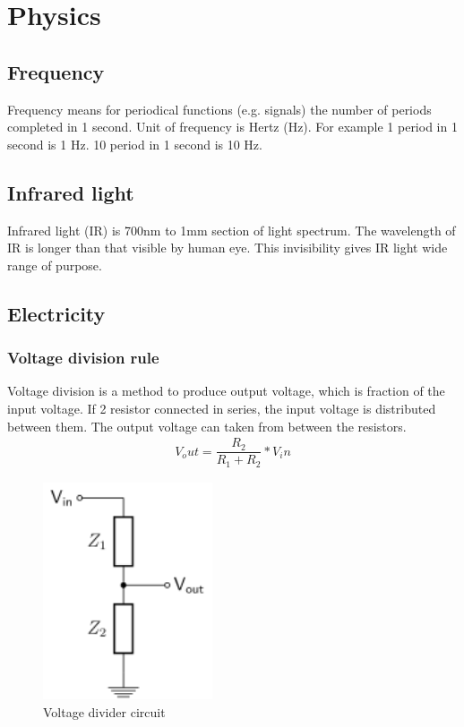 \documentclass[11pt,a4paper,oneside,article]{memoir}
\begin{document}
\chapter{Physics}\label{appx:first}
\section{Frequency}
Frequency means for periodical functions (e.g. signals) the number of periods completed in 1 second. Unit of frequency is Hertz (Hz). For example 1 period in 1 second is 1 Hz. 10 period in 1 second is 10 Hz.

\section{Infrared light}
Infrared light (IR) is 700nm to 1mm section of light spectrum. The wavelength of IR is longer than that visible by human eye. This invisibility gives IR light wide range of purpose.

\section{Electricity}
\subsection{Voltage division rule}
Voltage division is a method to produce output voltage, which is fraction of the input voltage. If 2 resistor connected in series, the input voltage is distributed between them. The output voltage can taken from between the resistors.
\begin{align}
V_out = \dfrac{R_2}{R_1 + R_2} * V_in
\end{align}

\begin{figure}
	\centering
	\includegraphics[width=5cm]{illustration/voltage_divider}
	\caption{Voltage divider circuit}
	\label{fig:Voltagedivider}
\end{figure}
\end{document}
